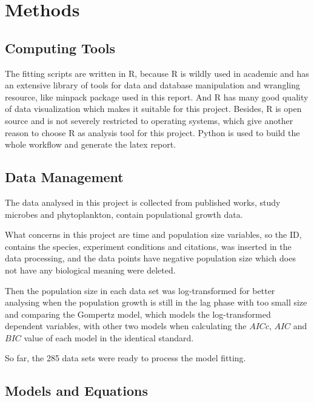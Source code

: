 \documentclass[11pt, a4paper]{article}
\begin{document}
  
  
\section{Methods}

\subsection{Computing Tools}
The fitting scripts are written in R, because R is wildly used in academic and has an extensive library of tools for data and database manipulation and wrangling resource, like minpack package used in this report. And R has many good quality of data visualization which makes it suitable for this project. Besides, R is open source and is not severely restricted to operating systems, which give another reason to choose R as analysis tool for this project. Python is used to build the whole workflow and generate the latex report.


\subsection{Data Management}
The data analysed in this project is collected from published works\citep{bae2014growth,bernhardt2018metabolic,galarz2016predicting,gill1991growth,phillips1987relation,roth1962continuity,silva2018modelling,sivonen1990effects,stannard1985temperature,zwietering1994modeling}, study microbes and phytoplankton, contain populational growth data. 

What concerns in this project are time and population size variables, so the ID, contains the species, experiment conditions and citations, was inserted in the data processing, and the data points have negative population size which does not have any biological meaning were deleted. 

Then the population size in each data set was log-transformed for better analysing when the population growth is still in the lag phase with too small size and comparing the Gompertz model, which models the log-transformed dependent variables, with other two models when calculating the $AICc$, $AIC$ and $BIC$ value of each model in the identical standard.

So far, the 285 data sets were ready to process the model fitting.


\subsection{Models and Equations}
\end{document}
